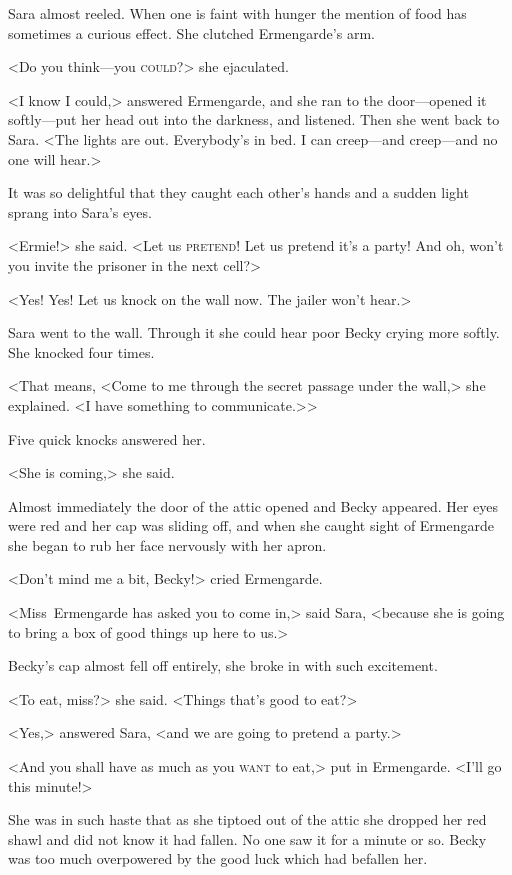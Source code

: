 Sara almost reeled. When one is faint with hunger the mention of food has sometimes a curious effect. She clutched Ermengarde's arm.

<Do you think—you \textsc{could}?> she ejaculated.

<I know I could,> answered Ermengarde, and she ran to the door—opened it softly—put her head out into the darkness, and listened. Then she went back to Sara. <The lights are out. Everybody's in bed. I can creep—and creep—and no one will hear.>

It was so delightful that they caught each other's hands and a sudden light sprang into Sara's eyes.

<Ermie!> she said. <Let us \textsc{pretend}! Let us pretend it's a party! And oh, won't you invite the prisoner in the next cell?>

<Yes! Yes! Let us knock on the wall now. The jailer won't hear.>

Sara went to the wall. Through it she could hear poor Becky crying more softly. She knocked four times.

<That means, <Come to me through the secret passage under the wall,> she explained. <I have something to communicate.>>

Five quick knocks answered her.

<She is coming,> she said.

Almost immediately the door of the attic opened and Becky appeared. Her eyes were red and her cap was sliding off, and when she caught sight of Ermengarde she began to rub her face nervously with her apron.

<Don't mind me a bit, Becky!> cried Ermengarde.

<Miss~Ermengarde has asked you to come in,> said Sara, <because she is going to bring a box of good things up here to us.>

Becky's cap almost fell off entirely, she broke in with such excitement.

<To eat, miss?> she said. <Things that's good to eat?>

<Yes,> answered Sara, <and we are going to pretend a party.>

<And you shall have as much as you \textsc{want} to eat,> put in Ermengarde. <I'll go this minute!>

She was in such haste that as she tiptoed out of the attic she dropped her red shawl and did not know it had fallen. No one saw it for a minute or so. Becky was too much overpowered by the good luck which had befallen her.

